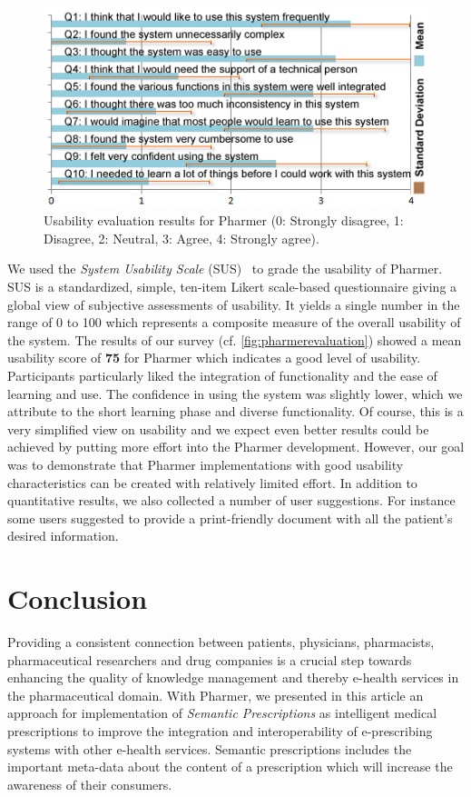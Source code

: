 \documentclass[conference]{IEEEtran}
\begin{document}
\begin{figure}[tb]
	\centering
		\includegraphics[width=1\columnwidth]{../images/pharmer_evaluation.jpg}
	\caption{Usability evaluation results for Pharmer (0: Strongly disagree, 1: Disagree, 2: Neutral, 3: Agree, 4: Strongly agree).}
	\label{fig:pharmerevaluation}
\end{figure}
We used the \emph{System Usability Scale} (SUS)~\cite{SUS2009} to grade the usability of Pharmer.
SUS is a standardized, simple, ten-item Likert scale-based questionnaire giving a global view of subjective assessments of usability.
It yields a single number in the range of 0 to 100 which represents a composite measure of the overall usability of the system.
The results of our survey (cf. \autoref{fig:pharmerevaluation}) showed a mean usability score of \textbf{75} for Pharmer which indicates a good level of usability.
Participants particularly liked the integration of functionality and the ease of learning and use.
The confidence in using the system was slightly lower, which we attribute to the short learning phase and diverse functionality.
Of course, this is a very simplified view on usability and we expect even better results could be achieved by putting more effort into the Pharmer development.
However, our goal was to demonstrate that Pharmer implementations with good usability characteristics can be created with relatively limited effort.
In addition to quantitative results, we also collected a number of user suggestions.
For instance some users suggested to provide a print-friendly document with all the patient's desired information.

\section{Conclusion}
\label{sec:conclusion}
Providing a consistent connection between patients, physicians, pharmacists, pharmaceutical researchers and drug companies is a crucial step towards enhancing the quality of knowledge management and thereby e-health services in the pharmaceutical domain.
With Pharmer, we presented in this article an approach for implementation of \emph{Semantic Prescriptions} as intelligent medical prescriptions to improve the integration and interoperability of e-prescribing systems with other e-health services.
Semantic prescriptions includes the important meta-data about the content of a prescription which will increase the awareness of their consumers.
\end{document}
